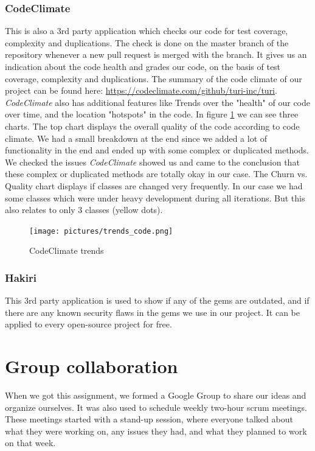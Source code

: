 \documentclass[a4paper]{article}
\begin{document}
\subsubsection{CodeClimate}
This is also a 3rd party application which checks our code for test coverage, complexity and duplications. The check is done on the master branch of the repository whenever a new pull request is merged with the branch. It gives us an indication about the code health and grades our code, on the basis of test coverage, complexity and duplications. The summary of the code climate of our project can be found here: \url{https://codeclimate.com/github/turi-inc/turi}. \\
\textit{CodeClimate} also has additional features like Trends over the "health" of our code over time, and the location "hotspots" in the code. In figure \ref{fig:codeclimate} we can see three charts. The top chart displays the overall quality of the code according to code climate. We had a small breakdown at the end since we added a lot of functionality in the end and ended up with some complex or duplicated methods. We checked the issues \textit{CodeClimate} showed us and came to the conclusion that these complex or duplicated methods are totally okay in our case. The Churn vs. Quality chart displays if classes are changed very frequently. In our case we had some classes which were under heavy development during all iterations. But this also relates to only 3 classes (yellow dots).

\begin{figure}[!h]
  \begin{center}
    \texttt{[image: pictures/trends\_code.png]}
    \caption{CodeClimate trends}
    \label{fig:codeclimate}
  \end{center}
\end{figure}

\subsubsection{Hakiri}
This 3rd party application is used to show if any of the gems are outdated, and if there are any known security flaws in the gems we use in our project. It can be applied to every open-source project for free.

\section{Group collaboration}
When we got this assignment, we formed a Google Group to share our ideas and organize ourselves. It was also used to schedule weekly two-hour scrum meetings. These meetings started with a stand-up session, where everyone talked about what they were working on, any issues they had, and what they planned to work on that week.\\
\end{document}
